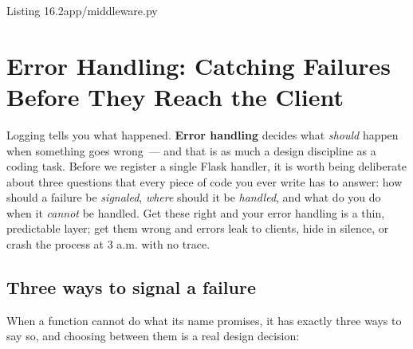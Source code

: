 \begin{codeboxcap}{\textcolor{accent}{Listing 16.2}\enspace app/middleware.py}
\begin{Shaded}
\begin{Highlighting}[]
            \NormalTok{,}
\NormalTok{        )}

\end{Highlighting}
\end{Shaded}

\end{codeboxcap}

\setcounter{section}{4}
\section{Error Handling: Catching Failures Before They Reach the Client}\label{16-logging-error-handling:165-error-handling-catching-failures-before-they-reach-the-client}

Logging tells you what happened. \textbf{Error handling} decides what \emph{should} happen when something goes wrong~--- and that is as much a design discipline as a coding task. Before we register a single Flask handler, it is worth being deliberate about three questions that every piece of code you ever write has to answer: how should a failure be \emph{signaled}, \emph{where} should it be \emph{handled}, and what do you do when it \emph{cannot} be handled. Get these right and your error handling is a thin, predictable layer; get them wrong and errors leak to clients, hide in silence, or crash the process at 3 a.m. with no trace.

\subsection*{Three ways to signal a failure}\label{16-logging-error-handling:three-ways-to-signal-a-failure}

When a function cannot do what its name promises, it has exactly three ways to say so, and choosing between them is a real design decision:

